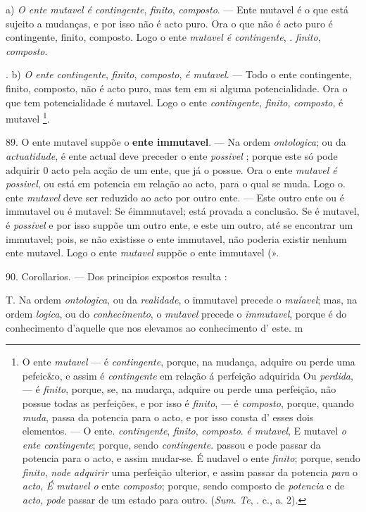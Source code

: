 a) \emph{O ente mutavel é contingente}, \emph{finito}, \emph{composto}. --- Ente mutavel é o que está sujeito a mudanças, e por isso não é acto puro. Ora o que não é acto puro é contingente, finito, composto. Logo o ente \emph{mutavel é contingente}, . \emph{finito}, \emph{composto}.

. b) \emph{O ente contingente}, \emph{finito}, \emph{composto}, \emph{é mutavel}. --- Todo o ente contingente, finito, composto, não é acto puro, mas tem em si alguma potencialidade. Ora o que tem potencialidade é mutavel. Logo o ente \emph{contingente}, \emph{finito}, \emph{composto}, é mutavel \footnote{O ente \emph{mutavel} --- é \emph{contingente}, porque, na mudança, adquire ou perde uma pefeic\&o, e assim é \emph{contingente} em relação á perfeição adquirida Ou \emph{perdida}, --- é \emph{finito}, porque, se, na mudarça, adquire ou perde uma perfeição, não possue todas as perfeições, e por isso é \emph{finito}, --- é \emph{composto}, porque, quando \emph{muda}, passa da potencia para o acto, e por isso consta d' esses dois elementos. --- O ente. \emph{contingente}, \emph{finito}, \emph{composto}. \emph{é mutavel}, E mutavel \emph{o ente contingente}; porque, sendo \emph{contingente}. passou e pode passar da potencia para o acto, e assim mudar-se. É nudavel o ente \emph{finito}; porque, sendo \emph{finito}, \emph{node adquirir} uma perfeição ulterior, e assim passar da potencia \emph{para} o \emph{acto}, \emph{É mutavel o} ente \emph{composto}; porque, sendo composto de \emph{potencia} e de \emph{acto}, \emph{pode} passar de um estado para outro. (\emph{Sum}. \emph{Te}, \textbar{}. c., a. 2).}.

89. O ente mutavel suppõe o \textbf{ente immutavel}. --- Na ordem \emph{ontologica}; ou da \emph{actuatidude}, é ente actual deve preceder o ente \emph{possivel} ; porque este só pode adquirir 0 acto pela acção de um   ente, que já o possue. Ora o ente \emph{mutavel é possivel}, ou está em potencia em relação ao acto, para o qual se muda. Logo o. ente \emph{mutavel} deve ser reduzido ao acto por outro ente. --- Este outro ente ou é immutavel ou é mutavel: Se éimmnutavel; está provada a conclusão. Se é mutavel, é \emph{possivel} e por isso suppõe um outro ente, e este um outro, até se encontrar um immutavel; pois, se não existisse o ente immutavel, não poderia existir nenhum ente mutavel. Logo o ente \emph{mutavel} suppõe o ente immutavel (».

90. Corollarios. --- Dos principios expostos resulta :

T. Na ordem \emph{ontologica}, ou da \emph{realidade}, o immutavel precede o \emph{muíavel}; mas, na ordem \emph{logica}, ou do \emph{conhecimento}, o \emph{mutavel} precede o \emph{immutavel}, porque é do conhecimento d'aquelle que nos elevamos ao conhecimento d' este. m

